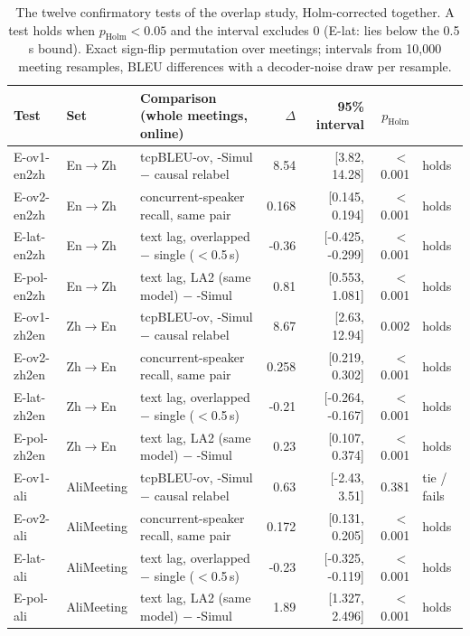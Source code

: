 \begin{table}[t]
\centering\small
\setlength{\tabcolsep}{4pt}
\begin{tabular}{lllrrrl}
\toprule
Test & Set & Comparison (whole meetings, online) & $\Delta$ & 95\% interval & $p_\text{Holm}$ & \\
\midrule
E-ov1-en2zh & En$\rightarrow$Zh & tcpBLEU-ov, \sys{}-Simul $-$ causal relabel & 8.54 & [3.82, 14.28] & $<$0.001 & holds \\
E-ov2-en2zh & En$\rightarrow$Zh & concurrent-speaker recall, same pair & 0.168 & [0.145, 0.194] & $<$0.001 & holds \\
E-lat-en2zh & En$\rightarrow$Zh & text lag, overlapped $-$ single ($<$0.5\,s) & -0.36 & [-0.425, -0.299] & $<$0.001 & holds \\
E-pol-en2zh & En$\rightarrow$Zh & text lag, LA2 (same model) $-$ \sys{}-Simul & 0.81 & [0.553, 1.081] & $<$0.001 & holds \\
E-ov1-zh2en & Zh$\rightarrow$En & tcpBLEU-ov, \sys{}-Simul $-$ causal relabel & 8.67 & [2.63, 12.94] & 0.002 & holds \\
E-ov2-zh2en & Zh$\rightarrow$En & concurrent-speaker recall, same pair & 0.258 & [0.219, 0.302] & $<$0.001 & holds \\
E-lat-zh2en & Zh$\rightarrow$En & text lag, overlapped $-$ single ($<$0.5\,s) & -0.21 & [-0.264, -0.167] & $<$0.001 & holds \\
E-pol-zh2en & Zh$\rightarrow$En & text lag, LA2 (same model) $-$ \sys{}-Simul & 0.23 & [0.107, 0.374] & $<$0.001 & holds \\
E-ov1-ali & AliMeeting & tcpBLEU-ov, \sys{}-Simul $-$ causal relabel & 0.63 & [-2.43, 3.51] & 0.381 & tie / fails \\
E-ov2-ali & AliMeeting & concurrent-speaker recall, same pair & 0.172 & [0.131, 0.205] & $<$0.001 & holds \\
E-lat-ali & AliMeeting & text lag, overlapped $-$ single ($<$0.5\,s) & -0.23 & [-0.325, -0.119] & $<$0.001 & holds \\
E-pol-ali & AliMeeting & text lag, LA2 (same model) $-$ \sys{}-Simul & 1.89 & [1.327, 2.496] & $<$0.001 & holds \\
\bottomrule
\end{tabular}
\caption{The twelve confirmatory tests of the overlap study, Holm-corrected together. A test holds when $p_\text{Holm}<0.05$ and
the interval excludes 0 (E-lat: lies below the 0.5\,s bound). Exact sign-flip permutation over meetings; intervals from
10,000 meeting resamples, BLEU differences with a decoder-noise draw per resample.}
\label{tab:reg8}
\end{table}
